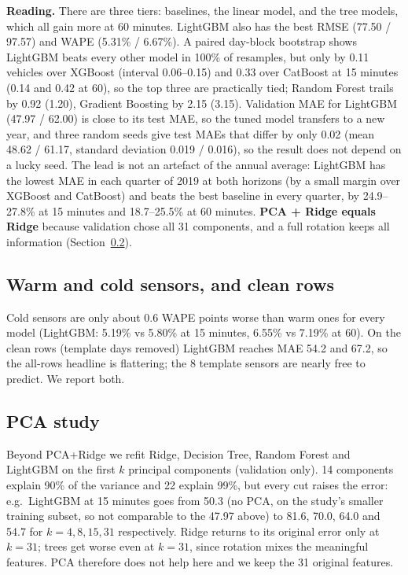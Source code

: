 ﻿\documentclass[11pt,a4paper]{article}
\begin{document}
\textbf{Reading.} There are three tiers: baselines, the linear model, and the tree models, which all gain more at 60 minutes. LightGBM also has the best RMSE (77.50 / 97.57) and WAPE (5.31\% / 6.67\%).
A paired day-block bootstrap shows LightGBM beats every other model in 100\% of resamples, but only by 0.11 vehicles over XGBoost (interval 0.06--0.15) and 0.33 over CatBoost at 15 minutes (0.14 and 0.42 at 60), so the top three are practically tied; Random Forest trails by 0.92 (1.20), Gradient Boosting by 2.15 (3.15).
Validation MAE for LightGBM (47.97 / 62.00) is close to its test MAE, so the tuned model transfers to a new year, and three random seeds give test MAEs that differ by only 0.02 (mean 48.62 / 61.17, standard deviation 0.019 / 0.016), so the result does not depend on a lucky seed.
The lead is not an artefact of the annual average: LightGBM has the lowest MAE in each quarter of 2019 at both horizons (by a small margin over XGBoost and CatBoost) and beats the best baseline in every quarter, by 24.9--27.8\% at 15 minutes and 18.7--25.5\% at 60 minutes.
\textbf{PCA + Ridge equals Ridge} because validation chose all 31 components, and a full rotation keeps all information (Section~\ref{sec:pca}).

\subsection{Warm and cold sensors, and clean rows}\label{sec:clean}
Cold sensors are only about 0.6 WAPE points worse than warm ones for every model (LightGBM: 5.19\% vs 5.80\% at 15 minutes, 6.55\% vs 7.19\% at 60). On the clean rows (template days removed) LightGBM reaches MAE 54.2 and 67.2, so the all-rows headline is flattering; the 8 template sensors are nearly free to predict. We report both.

\subsection{PCA study}\label{sec:pca}
Beyond PCA+Ridge we refit Ridge, Decision Tree, Random Forest and LightGBM on the first $k$ principal components (validation only). 14 components explain 90\% of the variance and 22 explain 99\%, but every cut raises the error: e.g.\ LightGBM at 15 minutes goes from 50.3 (no PCA, on the study's smaller training subset, so not comparable to the 47.97 above) to 81.6, 70.0, 64.0 and 54.7 for $k=4, 8, 15, 31$ respectively. Ridge returns to its original error only at $k=31$; trees get worse even at $k=31$, since rotation mixes the meaningful features. PCA therefore does not help here and we keep the 31 original features.
\end{document}
